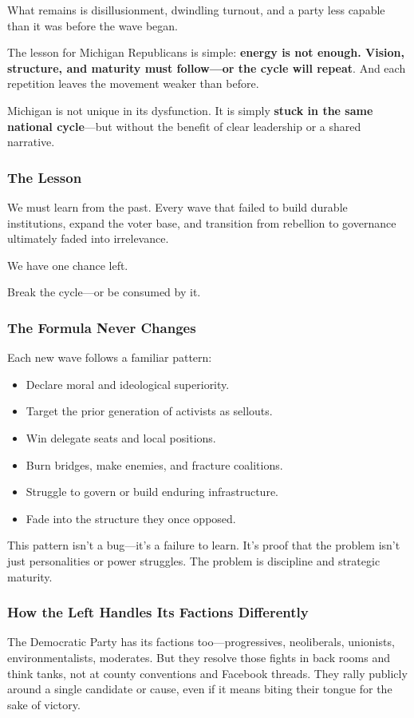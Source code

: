 What remains is disillusionment, dwindling turnout, and a party less capable than it was before the wave began.

The lesson for Michigan Republicans is simple: \textbf{energy is not enough. Vision, structure, and maturity must follow—or the cycle will repeat}. And each repetition leaves the movement weaker than before.

Michigan is not unique in its dysfunction. It is simply \textbf{stuck in the same national cycle}—but without the benefit of clear leadership or a shared narrative.

\subsubsection{The Lesson}
We must learn from the past. Every wave that failed to build durable institutions, expand the voter base, and transition from rebellion to governance ultimately faded into irrelevance.

We have one chance left.

Break the cycle—or be consumed by it.

\subsubsection{The Formula Never Changes}
Each new wave follows a familiar pattern:
\begin{itemize}
\item Declare moral and ideological superiority.
\item Target the prior generation of activists as sellouts.
\item Win delegate seats and local positions.
\item Burn bridges, make enemies, and fracture coalitions.
\item Struggle to govern or build enduring infrastructure.
\item Fade into the structure they once opposed.
\end{itemize}

This pattern isn’t a bug—it’s a failure to learn. It’s proof that the problem isn’t just personalities or power struggles. The problem is discipline and strategic maturity.

\subsubsection{How the Left Handles Its Factions Differently}
The Democratic Party has its factions too—progressives, neoliberals, unionists, environmentalists, moderates. But they resolve those fights in back rooms and think tanks, not at county conventions and Facebook threads. They rally publicly around a single candidate or cause, even if it means biting their tongue for the sake of victory.

